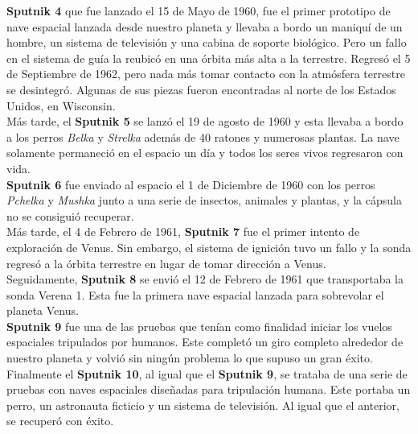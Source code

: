 \textbf{Sputnik 4} que fue lanzado el 15 de Mayo de 1960, fue el primer prototipo de nave espacial lanzada desde nuestro planeta y llevaba a bordo un maniquí de un hombre, un sistema de televisión y una cabina de soporte biológico. Pero un fallo en el sistema de guía la reubicó en una órbita más alta a la terrestre. Regresó el 5 de Septiembre de 1962, pero nada más tomar contacto con la atmósfera terrestre se desintegró. Algunas de sus piezas fueron encontradas al norte de los Estados Unidos, en Wisconsin.\\

Más tarde, el \textbf{Sputnik 5} se lanzó el 19 de agosto de 1960 y esta llevaba a bordo a los perros \textit{Belka} y \textit{Strelka} además de 40 ratones y numerosas plantas. La nave solamente permaneció en el espacio un día y todos los seres vivos regresaron con vida.\\

\textbf{Sputnik 6} fue enviado al espacio el 1 de Diciembre de 1960 con los perros \textit{Pchelka} y \textit{Mushka} junto a una serie de insectos, animales y plantas, y la cápsula no se consiguió recuperar. \\

Más tarde, el 4 de Febrero de 1961, \textbf{Sputnik 7} fue el primer intento de exploración de Venus. Sin embargo, el sistema de ignición tuvo un fallo y la sonda regresó a la órbita terrestre en lugar de tomar dirección a Venus.\\

Seguidamente, \textbf{Sputnik 8} se envió el 12 de Febrero de 1961 que transportaba la sonda Verena 1. Esta fue la primera nave espacial lanzada para sobrevolar el planeta Venus.\\

\textbf{Sputnik 9} fue una de las pruebas que tenían como finalidad iniciar los vuelos espaciales tripulados por humanos. Este completó un giro completo alrededor de nuestro planeta y volvió sin ningún problema lo que supuso un gran éxito.\\

Finalmente el \textbf{Sputnik 10}, al igual que el \textbf{Sputnik 9}, se trataba de una serie de pruebas con naves espaciales diseñadas para tripulación humana. Este portaba un perro, un astronauta ficticio y un sistema de televisión. Al igual que el anterior, se recuperó con éxito.

